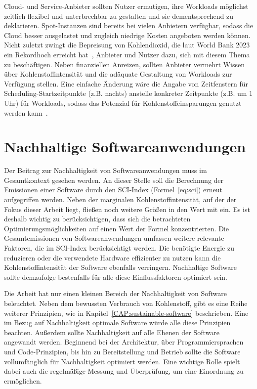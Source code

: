 Cloud- und Service-Anbieter sollten Nutzer ermutigen, ihre Workloads möglichst zeitlich flexibel und unterbrechbar zu gestalten und sie dementsprechend zu deklarieren.
Spot-Instanzen sind bereits bei vielen Anbietern verfügbar, sodass die Cloud besser ausgelastet und zugleich niedrige Kosten angeboten werden können.
Nicht zuletzt zwingt die Bepreisung von Kohlendioxid, die laut World Bank 2023 ein Rekordhoch erreicht hat~\cite{WorldBank.2023}, Anbieter und Nutzer dazu, sich mit diesem Thema zu beschäftigen.
Neben finanziellen Anreizen, sollten Anbieter vermehrt Wissen über Kohlenstoffintensität und die adäquate Gestaltung von Workloads zur Verfügung stellen.
Eine einfache Änderung wäre die Angabe von Zeitfenstern für Scheduling-Startzeitpunkte (z.B. nachts) anstelle konkreter Zeitpunkte (z.B. um 1 Uhr) für Workloads, sodass das Potenzial für Kohlenstoffeinsparungen genutzt werden kann~\cite{Wiesner.2021}.

\section{Nachhaltige Softwareanwendungen}
Der Beitrag zur Nachhaltigkeit von Softwareanwendungen muss im Gesamtkontext gesehen werden.
An dieser Stelle soll die Berechnung der Emissionen einer Software durch den \ac{SCI}-Index (Formel~\ref{eq:sci}) erneut aufgegriffen werden.
Neben der marginalen Kohlenstoffintensität, auf der der Fokus dieser Arbeit liegt, fließen noch weitere Größen in den Wert mit ein.
Es ist deshalb wichtig zu berücksichtigen, dass sich die betrachteten Optimierungsmöglichkeiten auf einen Wert der Formel konzentrierten.
Die Gesamtemissionen von Softwareanwendungen umfassen weitere relevante Faktoren, die im \ac{SCI}-Index berücksichtigt werden.
Die benötigte Energie zu reduzieren oder die verwendete Hardware effizienter zu nutzen kann die Kohlenstoffintensität der Software ebenfalls verringern.
Nachhaltige Software sollte demzufolge bestenfalls für alle diese Einflussfaktoren optimiert sein.

Die Arbeit hat nur einen kleinen Bereich der Nachhaltigkeit von Software beleuchtet.
Neben dem bewussten Verbrauch von Kohlenstoff, gibt es eine Reihe weiterer Prinzipien, wie in Kapitel~\ref{CAP:sustainable-software} beschrieben.
Eine im  Bezug auf Nachhaltigkeit optimale Software würde alle diese Prinzipien beachten.
Außerdem sollte Nachhaltigkeit auf alle Ebenen der Software angewandt werden.
Beginnend bei der Architektur, über Programmiersprachen und Code-Prinzipien, bis hin zu Bereitstellung und Betrieb sollte die Software vollumfänglich für Nachhaltigkeit optimiert werden.
Eine wichtige Rolle spielt dabei auch die regelmäßige Messung und Überprüfung, um eine Einordnung zu ermöglichen.
